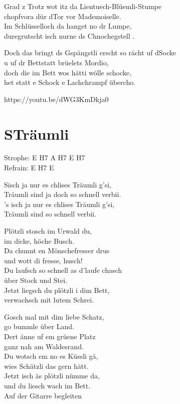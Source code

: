 \documentclass[
  letterpaper,
]{scrbook}
\begin{document}
Grad z Trotz wot itz da Lientuech-Blüemli-Stumpe\\
chopfvora dür d\textquotesingle Tor vor Mademoiselle.\\
Im Schlüsselloch da hanget no dr Lumpe,\\
duregrutscht isch nurne ds Chnochegstell .

Doch das bringt ds Gspängstli erscht so rächt uf
d\textquotesingle Socke\\
u uf dr Bettstatt brüelet\textquotesingle s Mordio,\\
doch die im Bett wo\textquotesingle s hätti wölle schocke,\\
het statt e Schock e Lachchrampf übercho.

https://youtu.be/dWG3KmDkja0

\hypertarget{struxe4umli}{%
\chapter{S\textquotesingle Träumli}\label{struxe4umli}}

Strophe: E H7 A H7 E H7\\
Refrain: E H7 E

S\textquotesingle isch ja nur es chlises Träumli g'si,\\
Träumli sind ja doch so schnell verbii.\\
's isch ja nur es chlises Träumli g'si,\\
Träumli sind so schnell verbii.

Plötzli stosch im Urwald du,\\
im dicke, höche Busch.\\
Da chunnt en Mönschefresser drus\\
und wott di fresse, husch!\\
Du laufsch so schnell as d'laufe chasch\\
über Stock und Stei.\\
Jetzt liegsch du plötzli i dim Bett,\\
verwachsch mit lutem Schrei.

Gosch mal mit dim liebe Schatz,\\
go bummle über Land.\\
Dert änne uf em grüene Platz\\
ganz nah am Waldesrand.\\
Du wotsch em no es Küssli gä,\\
wies Schätzli das gern hätt.\\
Jetzt isch äs plötzli nümme da,\\
und du liesch wach im Bett.\\
Auf der Gitarre begleiten
\end{document}
